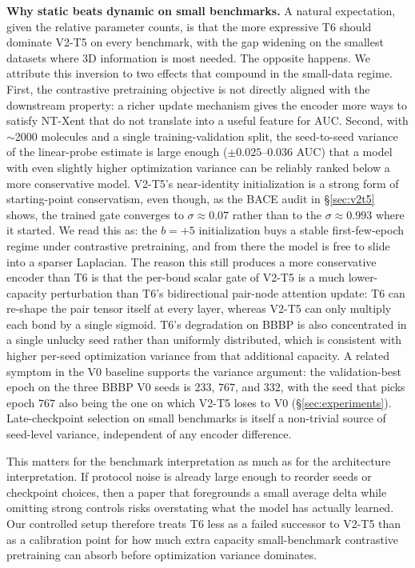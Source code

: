 \documentclass[conference]{IEEEtran}
\begin{document}
\noindent\textbf{Why static beats dynamic on small benchmarks.}
A natural expectation, given the relative parameter counts, is that the more expressive T6 should dominate V2-T5 on every benchmark, with the gap widening on the smallest datasets where 3D information is most needed. The opposite happens. We attribute this inversion to two effects that compound in the small-data regime. First, the contrastive pretraining objective is not directly aligned with the downstream property: a richer update mechanism gives the encoder more ways to satisfy NT-Xent that do not translate into a useful feature for AUC. Second, with $\sim$2000 molecules and a single training-validation split, the seed-to-seed variance of the linear-probe estimate is large enough ($\pm 0.025$--$0.036$ AUC) that a model with even slightly higher optimization variance can be reliably ranked below a more conservative model. V2-T5's near-identity initialization is a strong form of starting-point conservatism, even though, as the BACE audit in \S\ref{sec:v2t5} shows, the trained gate converges to $\sigma\approx 0.07$ rather than to the $\sigma\approx 0.993$ where it started. We read this as: the $b{=}{+}5$ initialization buys a stable first-few-epoch regime under contrastive pretraining, and from there the model is free to slide into a sparser Laplacian. The reason this still produces a more conservative encoder than T6 is that the per-bond scalar gate of V2-T5 is a much lower-capacity perturbation than T6's bidirectional pair-node attention update: T6 can re-shape the pair tensor itself at every layer, whereas V2-T5 can only multiply each bond by a single sigmoid. T6's degradation on BBBP is also concentrated in a single unlucky seed rather than uniformly distributed, which is consistent with higher per-seed optimization variance from that additional capacity. A related symptom in the V0 baseline supports the variance argument: the validation-best epoch on the three BBBP V0 seeds is $233$, $767$, and $332$, with the seed that picks epoch $767$ also being the one on which V2-T5 loses to V0 (\S\ref{sec:experiments}). Late-checkpoint selection on small benchmarks is itself a non-trivial source of seed-level variance, independent of any encoder difference.

This matters for the benchmark interpretation as much as for the architecture interpretation. If protocol noise is already large enough to reorder seeds or checkpoint choices, then a paper that foregrounds a small average delta while omitting strong controls risks overstating what the model has actually learned. Our controlled setup therefore treats T6 less as a failed successor to V2-T5 than as a calibration point for how much extra capacity small-benchmark contrastive pretraining can absorb before optimization variance dominates.
\end{document}
